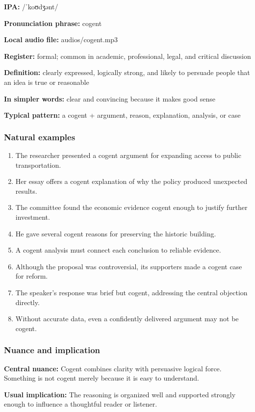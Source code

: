 \documentclass[11pt]{article}
\begin{document}
\textbf{IPA:} /ˈkoʊdʒənt/

\textbf{Pronunciation phrase:} cogent

\textbf{Local audio file:} audios/cogent.mp3

\textbf{Register:} formal; common in academic, professional, legal, and critical discussion

\textbf{Definition:} clearly expressed, logically strong, and likely to persuade people that an idea is true or reasonable

\textbf{In simpler words:} clear and convincing because it makes good sense

\textbf{Typical pattern:} a cogent + argument, reason, explanation, analysis, or case

\subsubsection{Natural examples}
\begin{enumerate}
  \item The researcher presented a cogent argument for expanding access to public transportation.
  \item Her essay offers a cogent explanation of why the policy produced unexpected results.
  \item The committee found the economic evidence cogent enough to justify further investment.
  \item He gave several cogent reasons for preserving the historic building.
  \item A cogent analysis must connect each conclusion to reliable evidence.
  \item Although the proposal was controversial, its supporters made a cogent case for reform.
  \item The speaker's response was brief but cogent, addressing the central objection directly.
  \item Without accurate data, even a confidently delivered argument may not be cogent.
\end{enumerate}

\subsubsection{Nuance and implication}
\textbf{Central nuance:} Cogent combines clarity with persuasive logical force. Something is not cogent merely because it is easy to understand.

\textbf{Usual implication:} The reasoning is organized well and supported strongly enough to influence a thoughtful reader or listener.
\end{document}
